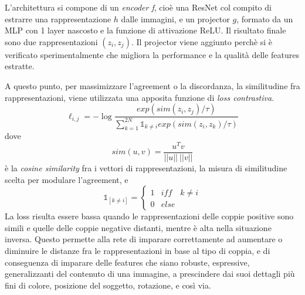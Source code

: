 \vspace{5mm}

L'architettura si compone di un \textit{encoder f}, cioè una ResNet \cite{resnet} col compito di estrarre una rappresentazione \(h\) dalle immagini, e un projector \(g\), formato da un MLP con 1 layer nascosto e la funzione di attivazione ReLU. Il risultato finale sono due rappresentazioni \((z_i, z_j)\). Il projector viene aggiunto perchè si è verificato sperimentalmente che migliora la performance e la qualità delle features estratte.

A questo punto, per massimizzare l'agreement o la discordanza, la similitudine fra rappresentazioni, viene utilizzata una apposita funzione di \textit{loss contrastiva}.
\begin{equation}
\ell_{i, j} = - \log \frac{exp(sim(z_i, z_j)/\tau)}{\sum^{2N}_{k=1}\mathbb{1}_{k \ne i}exp(sim(z_i, z_k)/\tau)}
\end{equation}
dove 
\begin{equation}
sim(u, v) = \frac{u^Tv}{||u|| \ ||v||}
\end{equation}
è la \textit{cosine similarity} fra i vettori di rappresentazioni, la misura di similitudine scelta per modulare l'agreement, e 
\begin{equation}
    \mathbb{1}_{[k \ne i]} = 
    \begin{cases}
    1 & iff \quad k \ne i \\
    0 & else
    \end{cases}
\end{equation}
La loss risulta essere bassa quando le rappresentazioni delle coppie positive sono simili e quelle delle coppie negative distanti, mentre è alta nella situazione inversa. Questo permette alla rete di imparare correttamente ad aumentare o diminuire le distanze fra le rappresentazioni in base al tipo di coppia, e di conseguenza di imparare delle features che siano robuste, espressive, generalizzanti del contenuto di una immagine, a prescindere dai suoi dettagli più fini di colore, posizione del soggetto, rotazione, e così via.

